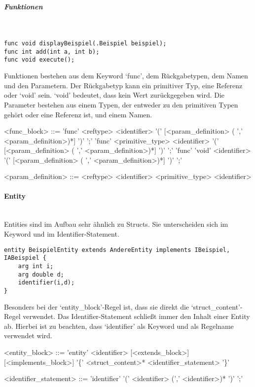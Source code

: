 \documentclass[./einleitung.tex]{subfiles}
\begin{document}
\subparagraph{Funktionen}\mbox{}\\
\begin{lstlisting}
func void displayBeispiel(.Beispiel beispiel);
func int add(int a, int b);
func void execute();
\end{lstlisting}
Funktionen bestehen aus dem Keyword `func', dem Rückgabetypen, dem Namen und den Parametern.
Der Rückgabetyp kann ein primitiver Typ, eine Referenz oder `void' sein.
`void' bedeutet, dass kein Wert zurückgegeben wird.
Die Parameter bestehen aus einem Typen, der entweder zu den primitiven Typen gehört oder eine Referenz ist, und einem Namen.
\begin{grammar}
<func_block> ::= 'func' <reftype> <identifier> '(' [<param_definition> ( ',' <param_definition>)*] ')' ';'
\alt 'func' <primitive_type> <identifier> '(' [<param_definition> ( ',' <param_definition>)*] ')' ';'
\alt 'func' 'void' <identifier> '(' [<param_definition> ( ',' <param_definition>)*] ')' ';'

<param_definition> ::= <reftype> <identifier>
\alt <primitive_type> <identifier>
\end{grammar}

\paragraph{Entity}\mbox{}\\
Entities sind im Aufbau sehr ähnlich zu Structs.
Sie unterscheiden sich im Keyword und im Identifier-Statement.
\begin{lstlisting}
entity BeispielEntity extends AndereEntity implements IBeispiel, IABeispiel {
    arg int i;
    arg double d;
    identifier(i,d);
}
\end{lstlisting}
Besonders bei der `entity\_block'-Regel ist, dass sie direkt die `struct_content'-Regel verwendet.
Das Identifier-Statement schließt immer den Inhalt einer Entity ab.
Hierbei ist zu beachten, dass `identifier' als Keyword und als Regelname verwendet wird.
\begin{grammar}
<entity_block> ::= 'entity' <identifier> [<extends_block>] [<implements_block>] '\{' <struct_content>* <identifier_statement> '\}' 

<identifier_statement> ::= 'identifier' '(' <identifier> (',' <identifier>)* ')' ';'
\end{grammar}
\end{document}
